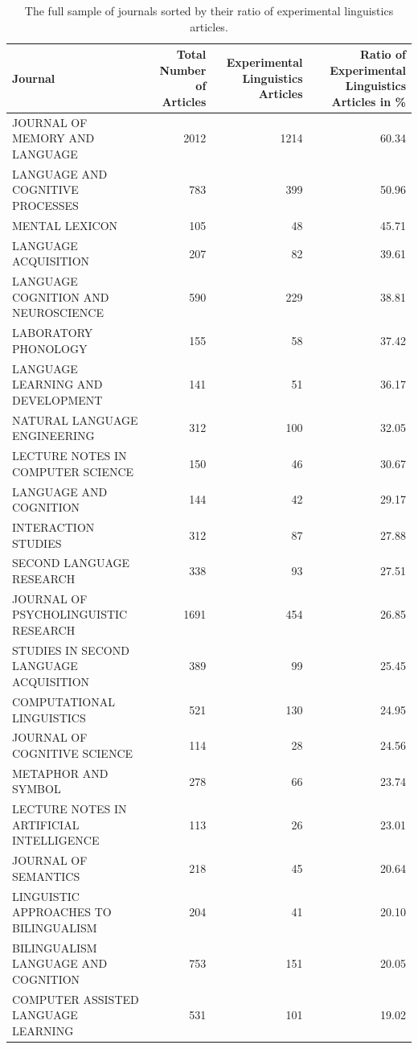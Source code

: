 \documentclass[]{elsarticle} %
\begin{document}
\begin{table}

\caption{\label{tab:journals_sample}The full sample of journals sorted by their ratio of experimental linguistics articles.}
\centering
\begin{tabular}[t]{l|r|r|r}
\hline
Journal & Total Number of Articles & Experimental Linguistics Articles & Ratio of Experimental Linguistics Articles in \%\\
\hline
JOURNAL OF MEMORY AND LANGUAGE & 2012 & 1214 & 60.34\\
\hline
LANGUAGE AND COGNITIVE PROCESSES & 783 & 399 & 50.96\\
\hline
MENTAL LEXICON & 105 & 48 & 45.71\\
\hline
LANGUAGE ACQUISITION & 207 & 82 & 39.61\\
\hline
LANGUAGE COGNITION AND NEUROSCIENCE & 590 & 229 & 38.81\\
\hline
LABORATORY PHONOLOGY & 155 & 58 & 37.42\\
\hline
LANGUAGE LEARNING AND DEVELOPMENT & 141 & 51 & 36.17\\
\hline
NATURAL LANGUAGE ENGINEERING & 312 & 100 & 32.05\\
\hline
LECTURE NOTES IN COMPUTER SCIENCE & 150 & 46 & 30.67\\
\hline
LANGUAGE AND COGNITION & 144 & 42 & 29.17\\
\hline
INTERACTION STUDIES & 312 & 87 & 27.88\\
\hline
SECOND LANGUAGE RESEARCH & 338 & 93 & 27.51\\
\hline
JOURNAL OF PSYCHOLINGUISTIC RESEARCH & 1691 & 454 & 26.85\\
\hline
STUDIES IN SECOND LANGUAGE ACQUISITION & 389 & 99 & 25.45\\
\hline
COMPUTATIONAL LINGUISTICS & 521 & 130 & 24.95\\
\hline
JOURNAL OF COGNITIVE SCIENCE & 114 & 28 & 24.56\\
\hline
METAPHOR AND SYMBOL & 278 & 66 & 23.74\\
\hline
LECTURE NOTES IN ARTIFICIAL INTELLIGENCE & 113 & 26 & 23.01\\
\hline
JOURNAL OF SEMANTICS & 218 & 45 & 20.64\\
\hline
LINGUISTIC APPROACHES TO BILINGUALISM & 204 & 41 & 20.10\\
\hline
BILINGUALISM LANGUAGE AND COGNITION & 753 & 151 & 20.05\\
\hline
COMPUTER ASSISTED LANGUAGE LEARNING & 531 & 101 & 19.02\\

\end{tabular}
\end{table}
\end{document}
